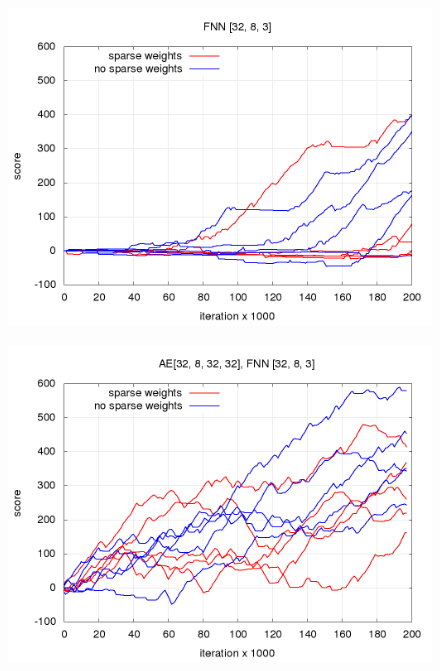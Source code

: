\documentclass[10pt,a4paper]{article}
\begin{document}
\begin{figure}[!htb]
\centering
\begin{minipage}{.5\textwidth}
  \centering
  \includegraphics[scale=0.3]{../../results/rl_worms/fnn_progress/training_progress.png}
  \label{img:worms FNN score progress comparison}
\end{minipage}%
\begin{minipage}{.5\textwidth}
  \centering
  \includegraphics[scale=0.3]{../../results/rl_worms/hnn_progress/training_progress.png}
  \label{img:worms AE+FNN score progress comparison}
\end{minipage}
\end{figure}
\end{document}
